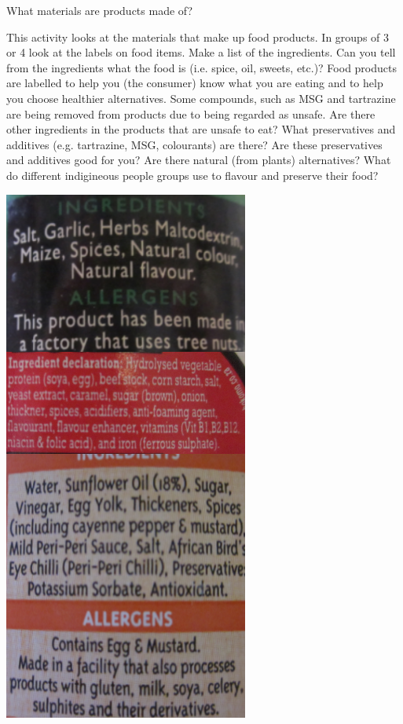    \label{m38708*eip-344}\begin{activity}{What materials are products made of?}
{
\begin{minipage}{.7\textwidth}
This activity looks at the materials that make up food products. In groups of 3 or 4 look at the labels on food items. Make a list of the ingredients. Can you tell from the ingredients what the food is (i.e. spice, oil, sweets, etc.)? Food products are labelled to help you (the consumer) know what you are eating and to help you choose healthier alternatives. Some compounds, such as MSG and tartrazine are being removed from products due to being regarded as unsafe. Are there other ingredients in the products that are unsafe to eat? What preservatives and additives (e.g. tartrazine, MSG, colourants) are there? Are these preservatives and additives good for you? Are there natural (from plants) alternatives? What do different indigineous people groups use to flavour and preserve their food? 
\end{minipage}
\begin{minipage}{.3\textwidth}
 \begin{center}
 \includegraphics[height=1.5\textwidth]{photos/food_labels.png}\par
\end{center}
\end{minipage}

 }  \end{activity}
